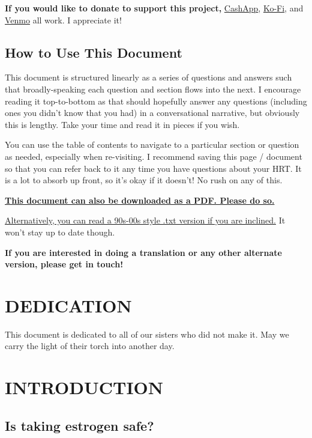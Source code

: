 \documentclass{article}
\begin{document}
\textbf{If you would like to donate to support this project,} \href{https://cash.app/Katitties}{CashApp}, \href{https://ko-fi.com/katitties}{Ko-Fi}, and \href{https://account.venmo.com/u/katitties}{Venmo} all work. I appreciate it!

\subsection*{How to Use This Document}

This document is structured linearly as a series of questions and answers such that broadly-speaking each question and section flows into the next. I encourage reading it top-to-bottom as that should hopefully answer any questions (including ones you didn’t know that you had) in a conversational narrative, but obviously this is lengthy. Take your time and read it in pieces if you wish.

You can use the table of contents to navigate to a particular section or question as needed, especially when re-visiting. I recommend saving this page / document so that you can refer back to it any time you have questions about your HRT. It is a lot to absorb up front, so it’s okay if it doesn’t! No rush on any of this.

\noindent\textbf{\href{pghrt.pdf}{This document can also be downloaded as a PDF. Please do so.}}

\noindent\href{pghrtgretchensversion.txt}{Alternatively, you can read a 90s-00s style .txt version if you are inclined.} It won't stay up to date though.

\noindent\textbf{If you are interested in doing a translation or any other alternate version, please get in touch!}



\section*{DEDICATION}

This document is dedicated to all of our sisters who did not make it. May we carry the light of their torch into another day.

 

\section{INTRODUCTION}

\subsection{Is taking estrogen safe?}
\end{document}
